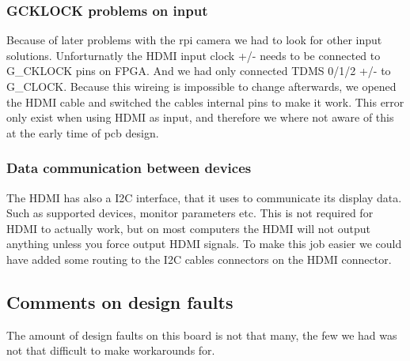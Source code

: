 \subsubsection{GCKLOCK problems on input}
Because of later problems with the rpi camera we had to look for other input solutions. Unforturnatly the HDMI input clock +/- needs to be connected to G\_CKLOCK pins on FPGA. And we had only connected TDMS 0/1/2 +/- to G\_CLOCK. Because this wireing is impossible to change afterwards, we opened the HDMI cable and switched the cables internal pins to make it work. This error only exist when using HDMI as input, and therefore we where not aware of this at the early time of pcb design. 
\subsubsection{Data communication between devices}
The HDMI has also a I2C interface, that it uses to communicate its display data. Such as supported devices, monitor parameters etc. This is not required for HDMI to actually work, but on most computers the HDMI will not output anything unless you force output HDMI signals. To make this job easier we could have added some routing to the I2C cables connectors on the HDMI connector. \cite{wikiddc}
\subsection{Comments on design faults}
The amount of design faults on this board is not that many, the few we had was not that difficult to make workarounds for. 

